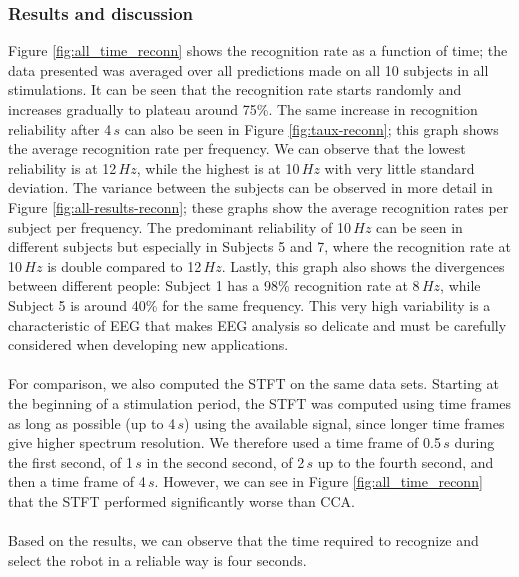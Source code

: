 \documentclass[smallextended]{svjour3}
\begin{document}
\subsubsection{Results and discussion}
Figure \ref{fig:all_time_reconn} shows the recognition rate as a function of time; the data presented was averaged over all predictions made on all 10 subjects in all stimulations.
It can be seen that the recognition rate starts randomly and increases gradually to plateau around 75\%.
The same increase in recognition reliability after 4\,$s$ can also be seen in Figure \ref{fig:taux-reconn}; this graph shows the average recognition rate per frequency.
We can observe that the lowest reliability is at 12\,$Hz$, while the highest is at 10\,$Hz$ with very little standard deviation.
The variance between the subjects can be observed in more detail in Figure \ref{fig:all-results-reconn}; these graphs show the average recognition rates per subject per frequency.
The predominant reliability of 10\,$Hz$ can be seen in different subjects but especially in Subjects 5 and 7, where the recognition rate at 10\,$Hz$ is double compared to 12\,$Hz$.
Lastly, this graph also shows the divergences between different people: Subject 1 has a 98\% recognition rate at 8\,$Hz$, while Subject 5 is around 40\% for the same frequency.
This very high variability is a characteristic of EEG that makes EEG analysis so delicate and must be carefully considered when developing new applications.\\
\\
For comparison, we also computed the STFT on the same data sets.
Starting at the beginning of a stimulation period, the STFT was computed using time frames as long as possible (up to 4\,$s$) using the available signal, since longer time frames give higher spectrum resolution. %
We therefore used a time frame of 0.5\,$s$ during the first second, of 1\,$s$ in the second second, of 2\,$s$ up to the fourth second, and then a time frame of 4\,$s$.
However, we can see in Figure \ref{fig:all_time_reconn} that the STFT performed significantly worse than CCA.\\
\\
Based on the results, we can observe that the time required to recognize and select the robot in a reliable way is four seconds. 
\end{document}
